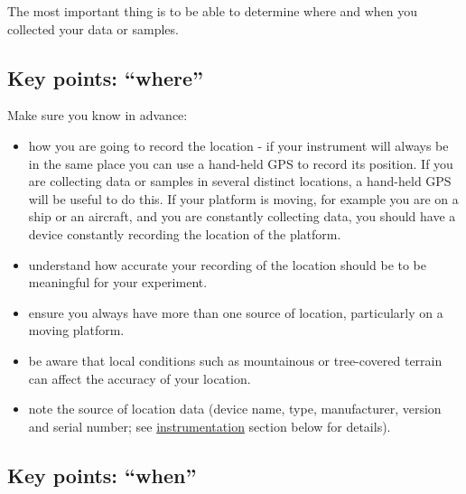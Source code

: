 \documentclass[a4paper,oneside]{report}
\providecommand{\tightlist}{%
  \setlength{\itemsep}{0pt}\setlength{\parskip}{0pt}}
\begin{document}
The most important thing is to be able to determine where and when you
collected your data or samples.

\hypertarget{key-points-where}{%
\subsection{Key points: ``where''}\label{key-points-where}}

Make sure you know in advance:

\begin{itemize}
\tightlist
\item
  how you are going to record the location - if your instrument will
  always be in the same place you can use a hand-held GPS to record its
  position. If you are collecting data or samples in several distinct
  locations, a hand-held GPS will be useful to do this. If your platform
  is moving, for example you are on a ship or an aircraft, and you are
  constantly collecting data, you should have a device constantly
  recording the location of the platform.
\item
  understand how accurate your recording of the location should be to be
  meaningful for your experiment.
\item
  ensure you always have more than one source of location, particularly
  on a moving platform.
\item
  be aware that local conditions such as mountainous or tree-covered
  terrain can affect the accuracy of your location.
\item
  note the source of location data (device name, type, manufacturer,
  version and serial number; see
  \protect\hyperlink{instrumentation-and-computers}{instrumentation}
  section below for details).
\end{itemize}

\hypertarget{key-points-when}{%
\subsection{Key points: ``when''}\label{key-points-when}}
\end{document}
